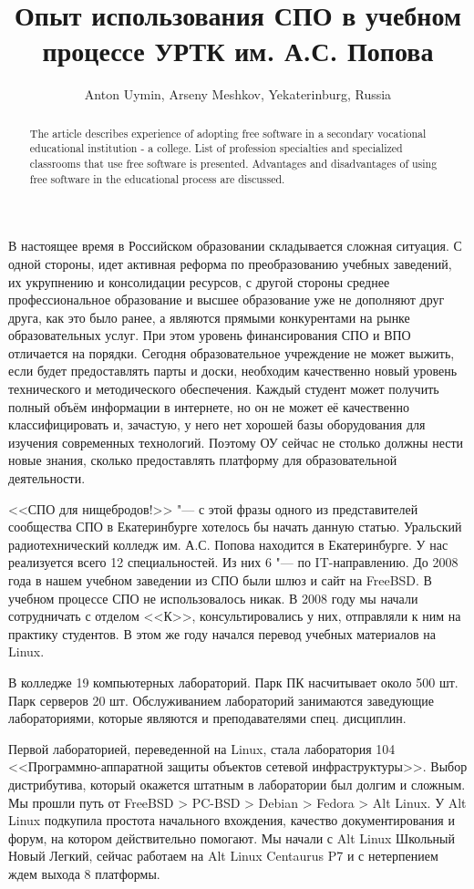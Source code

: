 \documentclass[10pt, a5paper]{article}
\begin{document}
\title{Опыт использования СПО в учебном процессе УРТК им. А.С. Попова}
\author{Anton Uymin, Arseny Meshkov, Yekaterinburg, Russia}
\maketitle
\begin{abstract}
The article describes experience of adopting free software in a secondary vocational educational institution - a college. List of profession specialties and specialized classrooms that use free software is presented. Advantages and disadvantages of using free software in the educational process are discussed.
\end{abstract}
В настоящее время в Российском образовании складывается сложная ситуация. С одной стороны, идет активная реформа по преобразованию учебных заведений, их укрупнению и консолидации ресурсов, с другой стороны среднее профессиональное образование и высшее образование уже не дополняют друг друга, как это было ранее, а являются прямыми конкурентами на рынке образовательных услуг. При этом уровень финансирования СПО и ВПО отличается на порядки. Сегодня образовательное учреждение не может выжить, если будет предоставлять парты и доски, необходим качественно новый уровень технического и методического обеспечения. Каждый студент может получить полный объём информации в интернете, но он не может её качественно классифицировать и, зачастую, у него нет хорошей базы оборудования для изучения современных технологий. Поэтому ОУ сейчас не столько должны нести новые знания, сколько предоставлять платформу для образовательной деятельности.

<<СПО для нищебродов!>> "--- с этой фразы одного из представителей сообщества СПО в Екатеринбурге хотелось бы начать данную статью. Уральский радиотехнический колледж им. А.С. Попова находится в Екатеринбурге. У нас реализуется всего 12 специальностей. Из них 6 "--- по IT-направлению. До 2008 года в нашем учебном заведении из СПО были шлюз и сайт на FreeBSD. В учебном процессе СПО не использовалось никак. В 2008 году мы начали сотрудничать с отделом <<К>>, консультировались у них, отправляли к ним на практику студентов. В этом же году начался перевод учебных материалов на Linux.

В колледже 19 компьютерных лабораторий. Парк ПК насчитывает около 500 шт. Парк серверов 20 шт. Обслуживанием лабораторий занимаются заведующие лабораториями, которые являются и преподавателями спец. дисциплин.

Первой лабораторией, переведенной на Linux, стала лаборатория 104 <<Программно-аппаратной защиты объектов сетевой инфраструктуры>>. Выбор дистрибутива, который окажется штатным в лаборатории был долгим и сложным. Мы прошли путь от FreeBSD \textgreater{} PC-BSD \textgreater{} Debian \textgreater{} Fedora \textgreater{} Alt Linux. У Alt Linux подкупила простота начального вхождения, качество документирования и форум, на котором действительно помогают. Мы начали с Alt Linux Школьный Новый Легкий, сейчас работаем на Alt Linux Centaurus P7 и с нетерпением ждем выхода 8 платформы.
\end{document}
